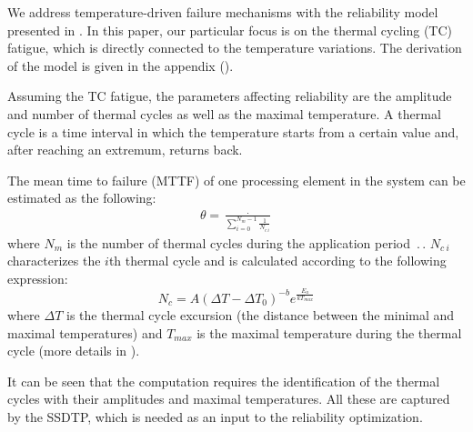 We address temperature-driven failure mechanisms with the reliability model presented in \cite{huang2009, xiang2010}. In this paper, our particular focus is on the thermal cycling (TC) fatigue, which is directly connected to the temperature variations. The derivation of the model is given in the appendix ().

Assuming the TC fatigue, the parameters affecting reliability are the amplitude and number of thermal cycles as well as the maximal temperature. A thermal cycle is a time interval in which the temperature starts from a certain value and, after reaching an extremum, returns back.

The mean time to failure (MTTF) of one processing element in the system can be estimated as the following:
\begin{align} \label{eq:one-mttf}
  \theta = \frac{\period}{\sum_{i=0}^{N_m - 1} \frac{1}{N_{c \: i}}}
\end{align}
where $N_m$ is the number of thermal cycles during the application period $\period$. $N_{c \: i}$ characterizes the $i$th thermal cycle and is calculated according to the following expression:
\begin{equation} \label{eq:cycles-to-failure}
  N_c = A (\Delta T - \Delta T_0)^{-b} e^{\frac{E_a}{k T_{max}}}
\end{equation}
where $\Delta T$ is the thermal cycle excursion (the distance between the minimal and maximal temperatures) and $T_{max}$ is the maximal temperature during the thermal cycle (more details in ).

It can be seen that the computation requires the identification of the thermal cycles with their amplitudes and maximal temperatures. All these are captured by the SSDTP, which is needed as an input to the reliability optimization.
